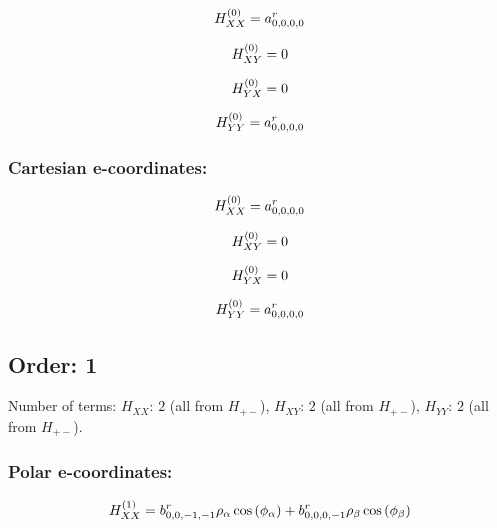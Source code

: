 \documentclass[fleqn]{article}
\begin{document}
\begin{dmath*}
H_{XX}^{(0)}=a^{r}_{0,0,0,0}\\
\end{dmath*}

\begin{dmath*}
H_{XY}^{(0)}=0\\
\end{dmath*}

\begin{dmath*}
H_{YX}^{(0)}=0\\
\end{dmath*}

\begin{dmath*}
H_{YY}^{(0)}= a^{r}_{0,0,0,0}\\
\end{dmath*}
\subsubsection*{Cartesian e-coordinates:}

\begin{dmath*}
H_{XX}^{(0)}=a^{r}_{0,0,0,0}\\
\end{dmath*}

\begin{dmath*}
H_{XY}^{(0)}=0\\
\end{dmath*}

\begin{dmath*}
H_{YX}^{(0)}=0\\
\end{dmath*}

\begin{dmath*}
H_{YY}^{(0)}= a^{r}_{0,0,0,0}\\
\end{dmath*}
\subsection{Order: 1}
Number of terms: $H_{XX}$: $2$ (all from $H_{+-}$), $H_{XY}$: $2$ (all from $H_{+-}$), $H_{YY}$: $2$ (all from $H_{+-}$).
\subsubsection*{Polar e-coordinates:}

\begin{dmath*}
H_{XX}^{(1)}=b^{r}_{0,0,-1,-1} \rho_{\alpha} \cos{\left (\phi_{\alpha} \right )} + b^{r}_{0,0,0,-1} \rho_{\beta} \cos{\left (\phi_{\beta} \right )}\\
\end{dmath*}
\end{document}
